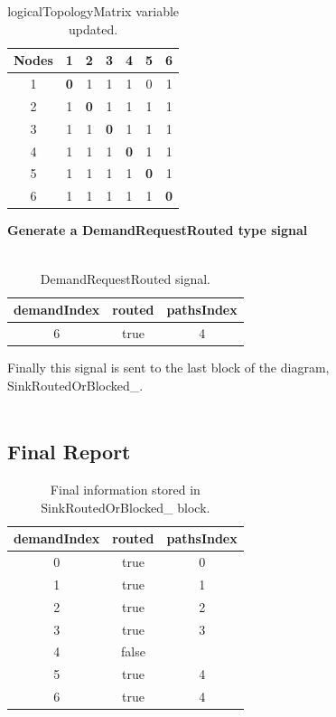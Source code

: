 \begin{table}[H]
	\centering	
	\begin{tabular}{|c|c|c|c|c|c|c|}
		\hline
		\multicolumn{1}{|l|}{\textbf{Nodes}} & 1   & 2   & 3   & 4   & 5   & 6  \\ \hline
		1                           & \textbf{0}   & 1 & 1 & 1 & 0 & 1 \\ \hline
		2                           & 1 & \textbf{0}   & 1 & 1 & 1 & 1 \\ \hline
		3                           & 1 & 1 & \textbf{0}   & 1 & 1 & 1 \\ \hline
		4                           & 1 & 1 & 1 & \textbf{0}   & 1 & 1 \\ \hline
		5                           & 1 & 1 & 1 & 1 & \textbf{0}   & 1 \\ \hline
		6                           & 1 & 1 & 1 & 1 & 1 & \textbf{0}   \\ \hline
	\end{tabular}
	\caption{logicalTopologyMatrix variable updated.}
	\label{Transparentlogical_topology_updated}
\end{table}

\textbf{Generate a DemandRequestRouted type signal}\\ \\

\begin{table}[H]
	\centering
	\begin{tabular}{|c|c|c|}
		\hline
		demandIndex & routed & pathsIndex \\ \hline
		6 & true & 4 \\ \hline
	\end{tabular}
	\caption{DemandRequestRouted signal.}
\end{table}

Finally this signal is sent to the last block of the diagram, SinkRoutedOrBlocked\_.\\ \\

\subsection{Final Report}
\begin{table}[H]
	\centering
	\begin{tabular}{|c|c|c|}
		\hline
		demandIndex & routed & pathsIndex \\ \hline
		0 & true & 0 \\ \hline
		1 & true & 1 \\ \hline
		2 & true & 2 \\ \hline
		3 & true & 3 \\ \hline
		4 & false &  \\ \hline
		5 & true & 4 \\ \hline
		6 & true & 4 \\ \hline
	\end{tabular}
	\caption{Final information stored in SinkRoutedOrBlocked\_  block.}
\end{table}

